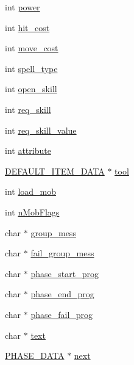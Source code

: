 \begin{DoxyCompactItemize}
\item 
int \hyperlink{structphase__data_a4fc9dc100c3fab5fd56564bdc2a9b254}{power}
\item 
int \hyperlink{structphase__data_a4f1aebbdfa1ef696ba06ed2463ee13ec}{hit\-\_\-cost}
\item 
int \hyperlink{structphase__data_a87d45e268bdb657389342f897d427512}{move\-\_\-cost}
\item 
int \hyperlink{structphase__data_a5a0f618475c3609f1eec926c54e1f47f}{spell\-\_\-type}
\item 
int \hyperlink{structphase__data_ae7dff8b78d0e156fcf8f09799261876e}{open\-\_\-skill}
\item 
int \hyperlink{structphase__data_aa52e722cbaad6760a1283e42eef3044d}{req\-\_\-skill}
\item 
int \hyperlink{structphase__data_aac527e93bffc20190ca971b28737d676}{req\-\_\-skill\-\_\-value}
\item 
int \hyperlink{structphase__data_a5e00aebd5e8ce8a4c25176dd7845c87f}{attribute}
\item 
\hyperlink{structs_8h_a0d3564d2558ddecb8307de195707d292}{D\-E\-F\-A\-U\-L\-T\-\_\-\-I\-T\-E\-M\-\_\-\-D\-A\-T\-A} $\ast$ \hyperlink{structphase__data_ad7745d032eb700e8126ac725c96e77f2}{tool}
\item 
int \hyperlink{structphase__data_a03494c7e7ad07ef8f08726e3eeb0db03}{load\-\_\-mob}
\item 
int \hyperlink{structphase__data_a553744d8369dcc3c4d0a7d80b368f9ee}{n\-Mob\-Flags}
\item 
char $\ast$ \hyperlink{structphase__data_a524125e9bfa18be1ef995f2c2edfe87b}{group\-\_\-mess}
\item 
char $\ast$ \hyperlink{structphase__data_a2bc2d03f876c0daeda0e500214108ff3}{fail\-\_\-group\-\_\-mess}
\item 
char $\ast$ \hyperlink{structphase__data_a4eecbb5f682b2f32fdc951cd44f1205c}{phase\-\_\-start\-\_\-prog}
\item 
char $\ast$ \hyperlink{structphase__data_adbc98c8a0882d65392b63525ed8a96d8}{phase\-\_\-end\-\_\-prog}
\item 
char $\ast$ \hyperlink{structphase__data_a389ca93d924bf2963d3f97d46e4cb12f}{phase\-\_\-fail\-\_\-prog}
\item 
char $\ast$ \hyperlink{structphase__data_a95fc699cc53035ecf0d18adbed5e47b0}{text}
\item 
\hyperlink{structs_8h_a946fd03f2da414ee020673d226fbae22}{P\-H\-A\-S\-E\-\_\-\-D\-A\-T\-A} $\ast$ \hyperlink{structphase__data_a92ce59cb45e426c6fd697fe5b0ae1637}{next}
\end{DoxyCompactItemize}


